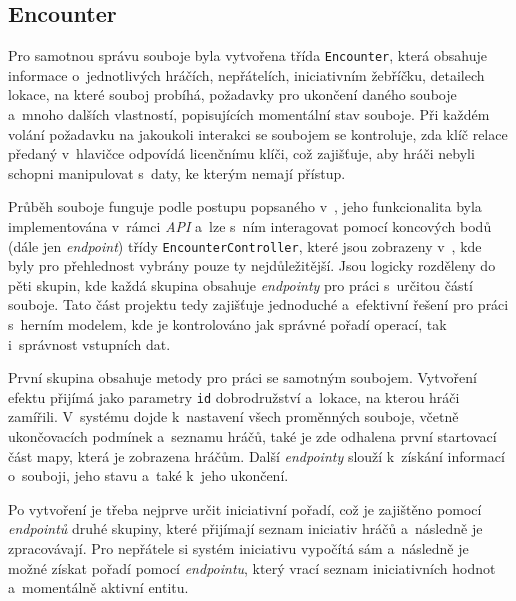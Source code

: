 \begin{listing}[H]
    \inputminted{Java}{code/EncounterEntity.java}
    \caption{Zdrojový kód třídy Entity}
    \label{code:entity}
\end{listing}

\subsection{Encounter}
\label{subsec:impl_encounter}

Pro samotnou správu souboje byla vytvořena třída \texttt{Encounter}, která obsahuje informace o~jednotlivých hráčích, nepřátelích, iniciativním žebříčku, detailech lokace, na které souboj probíhá, požadavky pro ukončení daného souboje a~mnoho dalších vlastností, popisujících momentální stav souboje. Při každém volání požadavku na jakoukoli interakci se soubojem se kontroluje, zda klíč relace předaný v~hlavičce odpovídá licenčnímu klíči, což zajišťuje, aby hráči nebyli schopni manipulovat s~daty, ke kterým nemají přístup.

Průběh souboje funguje podle postupu popsaného v~, jeho funkcionalita byla implementována v~rámci \textit{API} a~lze s~ním interagovat pomocí koncových bodů (dále jen \textit{endpoint}) třídy \texttt{EncounterController}, které jsou zobrazeny v~, kde byly pro přehlednost vybrány pouze ty nejdůležitější. Jsou logicky rozděleny do pěti skupin, kde každá skupina obsahuje \textit{endpointy} pro práci s~určitou částí souboje. Tato část projektu tedy zajišťuje jednoduché a~efektivní řešení pro práci s~herním modelem, kde je kontrolováno jak správné pořadí operací, tak i~správnost vstupních dat.



První skupina obsahuje metody pro práci se samotným soubojem. Vytvoření efektu přijímá jako parametry \texttt{id} dobrodružství a~lokace, na kterou hráči zamířili. V~systému dojde k~nastavení všech proměnných souboje, včetně ukončovacích podmínek a~seznamu hráčů, také je zde odhalena první startovací část mapy, která je zobrazena hráčům. Další \textit{endpointy} slouží k~získání informací o~souboji, jeho stavu a~také k~jeho ukončení.

Po vytvoření je třeba nejprve určit iniciativní pořadí, což je zajištěno pomocí \textit{endpointů} druhé skupiny, které přijímají seznam iniciativ hráčů a~následně je zpracovávají. Pro nepřátele si systém iniciativu vypočítá sám a~následně je možné získat pořadí pomocí \textit{endpointu}, který vrací seznam iniciativních hodnot a~momentálně aktivní entitu.

